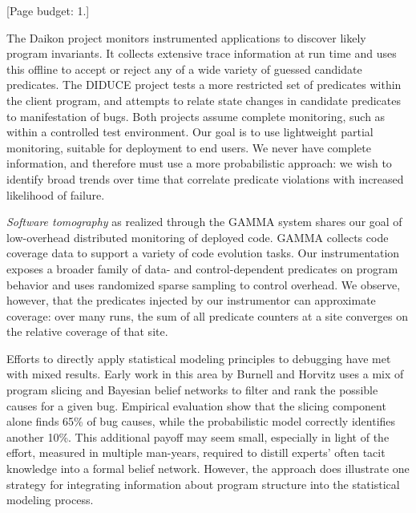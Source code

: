 \documentclass{acm_proc_article-sp}
\newcommand{\termdef}[1]{\textit{#1}}
\newcommand{\placeholder}[1]{{\color[cmyk]{0,0.61,0.87,0}[#1]}}
\begin{document}
\placeholder{Page budget: 1.}

The Daikon project \cite{ernst2001} monitors instrumented applications
to discover likely program invariants.  It collects extensive trace
information at run time and uses this offline to accept or reject any
of a wide variety of guessed candidate predicates.  The DIDUCE project
\cite{ICSE02*291} tests a more restricted set of predicates within the
client program, and attempts to relate state changes in candidate
predicates to manifestation of bugs.  Both projects assume complete
monitoring, such as within a controlled test environment.  Our goal is
to use lightweight partial monitoring, suitable for deployment to end
users.  We never have complete information, and therefore must use a
more probabilistic approach: we wish to identify broad trends over
time that correlate predicate violations with increased likelihood of
failure.

\termdef{Software tomography} as realized through the GAMMA system
\cite{PASTE'02*2,Orso:2003:LFDIART} shares our goal of low-overhead
distributed monitoring of deployed code.  GAMMA collects code coverage
data to support a variety of code evolution tasks.  Our
instrumentation exposes a broader family of data- and
control-dependent predicates on program behavior and uses randomized
sparse sampling to control overhead.  We observe, however, that the
predicates injected by our instrumentor can approximate coverage: over
many runs, the sum of all predicate counters at a site converges on
the relative coverage of that site.

Efforts to directly apply statistical modeling principles to debugging
have met with mixed results.  Early work in this area by Burnell and
Horvitz \cite{Burnell:1995:SCM} uses a mix of program slicing and
Bayesian belief networks to filter and rank the possible causes for a
given bug.  Empirical evaluation show that the slicing component alone
finds 65\% of bug causes, while the probabilistic model correctly
identifies another 10\%.  This additional payoff may seem small,
especially in light of the effort, measured in multiple man-years,
required to distill experts' often tacit knowledge into a formal
belief network.  However, the approach does illustrate one strategy
for integrating information about program structure into the
statistical modeling process.
\end{document}
